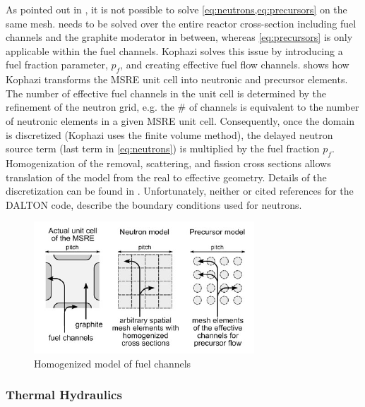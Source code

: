 \documentclass{article}
\let\Oldsubsubsection\subsubsection
\renewcommand{\subsubsection}{\FloatBarrier\Oldsubsubsection}
\begin{document}
As pointed out in \cite{kophazi_development_2009}, it is not possible to solve
\cref{eq:neutrons,eq:precursors} on the same mesh.  needs to
be solved over the entire reactor cross-section including fuel channels and the
graphite moderator in between, whereas \cref{eq:precursors} is only applicable
within the fuel channels. Kophazi solves this issue by introducing a fuel
fraction parameter, $p_f$, and creating effective fuel flow
channels.  shows how Kophazi transforms the \gls{MSRE} unit
cell into neutronic and precursor elements. The number of effective fuel
channels in the unit cell is determined by the refinement of the neutron grid,
e.g. the \# of channels is equivalent to the number of neutronic elements in a
given \gls{MSRE} unit cell. Consequently, once the domain is discretized (Kophazi uses
the finite volume method), the delayed neutron source term (last term in
\cref{eq:neutrons}) is multiplied by the fuel fraction $p_f$. Homogenization of
the removal, scattering, and fission cross sections allows translation of the
model from the real to effective geometry. Details of the discretization can be
found in \cite{kophazi_development_2009}. Unfortunately, neither
\cite{kophazi_development_2009} or cited references for the DALTON code,
describe the boundary conditions used for neutrons.

\begin{figure}[htpb]
  \centering
  \includegraphics[max height=.5\textheight,max width=\textwidth,keepaspectratio]{kophazi_neutronics_discretization.png}
  \caption{Homogenized model of fuel channels \cite{kophazi_development_2009}}
  \label{fig:kophazi_homo}
\end{figure}

\subsubsection{Thermal Hydraulics}
\end{document}
